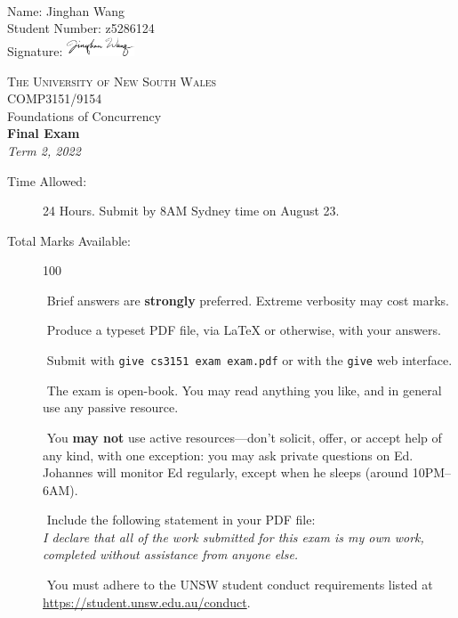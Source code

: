 \documentclass[a4paper,answers]{exam}
\begin{document}
\begin{flushright}
   $\ $\\[5em] Name: Jinghan Wang \\[1em]
    Student Number: z5286124 \\[1em]
    Signature: \includegraphics[width=0.15\textwidth]{sign}\\[3em]
\end{flushright}
\begin{center}
\textsc{\Large The University of New South Wales}\\[3em]
{\Huge COMP3151/9154\\[0.3em] Foundations of Concurrency}\\[3em]
{\Large \textbf{Final Exam}}\\[1em]
{\large \textit{Term 2, 2022}}\\[5.7em]
{\large
\begin{description}
    \item[Time Allowed:] 24 Hours. Submit by 8AM Sydney time on August 23.
    \item[Total Marks Available:] 100
    \item[] $\!\!\!\!\!$ Brief answers are \textbf{strongly} preferred. Extreme verbosity may cost marks.
    \item[] $\!\!\!\!\!$ Produce a typeset PDF file, via \LaTeX{} or otherwise, with your answers.
    \item[] $\!\!\!\!\!$ Submit with \texttt{give cs3151 exam exam.pdf} or with the \texttt{give} web interface.
    \item[] $\!\!\!\!\!$ The exam is open-book. You may read anything you like, and in general use any passive resource.
    \item[] $\!\!\!\!\!$ You \textbf{may not} use active resources---don't solicit, offer, or accept help of any kind, with one exception: you may ask private questions on Ed. Johannes will monitor Ed regularly, except when he sleeps (around 10PM--6AM).
    \item[] $\!\!\!\!\!$ Include the following statement in your PDF file:\\
\emph{I declare that all of the work submitted for this exam is my own work, completed without assistance from anyone else.}
   \item[] $\!\!\!\!\!$ You must adhere to the UNSW student conduct requirements listed at\\ \url{https://student.unsw.edu.au/conduct}.
\end{description}
}
\end{center}
\newpage
\end{document}
